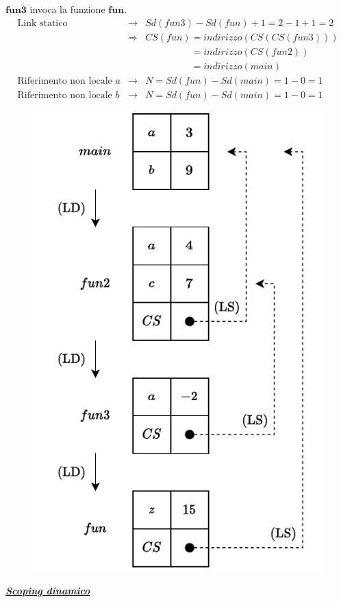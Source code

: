 \documentclass[a4paper]{article}
\begin{document}
	\noindent
	$\mathbf{fun3}$ invoca la funzione $\mathbf{fun}$.
	\begin{equation*}
		\begin{array}{rcl}
			\text{Link statico} &\rightarrow& Sd(fun3) - Sd(fun) + 1 = 2 - 1 + 1 = 2 \\ [.3em]
			&\Rightarrow& CS(fun) = indirizzo(CS(CS(fun3))) \\ [.3em]
			&&\phantom{ CS(fun)} = indirizzo(CS(fun2)) \\ [.3em]
			&&\phantom{ CS(fun)} = indirizzo(main) \\ [.3em]
			\text{Riferimento non locale }a &\rightarrow& N = Sd(fun) - Sd(main) = 1 - 0 = 1 \\ [.3em]
			\text{Riferimento non locale }b &\rightarrow& N = Sd(fun) - Sd(main) = 1 - 0 = 1
		\end{array}
	\end{equation*}
	\begin{figure}[!htp]
		\centering
		\includegraphics[width=.7\textwidth]{img/ex3-017.pdf}
	\end{figure}\newpage
	
	\begin{center}
		\textbf{\emph{\underline{Scoping dinamico}}}
	\end{center}
	
\end{document}
